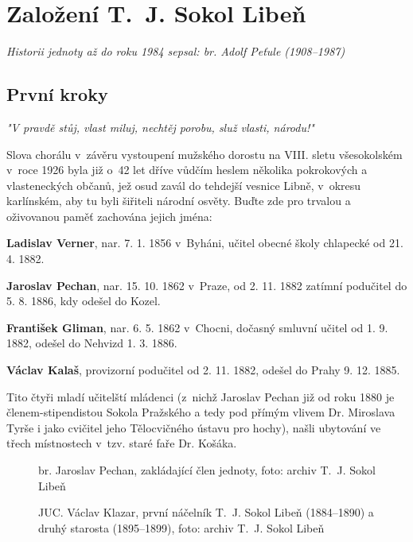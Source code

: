 \documentclass[a5paper, 12pt, twoside]{article}
\begin{document}
\clearpage

\section{Založení T.~J. Sokol Libeň}
\vspace{\baselineskip}

\textit{Historii jednoty až do roku 1984 sepsal: br. Adolf Peťule (1908–1987)}

\subsection{První kroky}

\begin{center}
  \textit{"V pravdě stůj, vlast miluj, nechtěj porobu, služ vlasti, národu!"}
\end{center}
\noindent Slova chorálu v~závěru vystoupení mužského dorostu na VIII. sletu všesokolském v~roce 1926 byla již o~42 let dříve vůdčím heslem několika pokrokových a vlasteneckých občanů, jež osud zavál do tehdejší vesnice Libně, v~okresu karlínském, aby tu byli šiřiteli národní osvěty. Buďte zde pro trvalou a oživovanou paměť zachována jejich jména:

\textbf{Ladislav Verner}, nar. 7. 1. 1856 v~Byháni, učitel obecné školy chlapecké od 21. 4. 1882.

\textbf{Jaroslav Pechan}, nar. 15. 10. 1862 v~Praze, od 2. 11. 1882 zatímní podučitel do 5. 8. 1886, kdy odešel do Kozel.

\textbf{František Gliman}, nar. 6. 5. 1862 v~Chocni, dočasný smluvní učitel od 1. 9. 1882, odešel do Nehvizd 1. 3. 1886.

\textbf{Václav Kalaš}, provizorní podučitel od 2. 11. 1882, odešel do Prahy 9. 12. 1885.

Tito čtyři mladí učitelští mládenci (z~nichž Jaroslav Pechan již od roku 1880 je členem-stipendistou Sokola Pražského a tedy pod přímým vlivem Dr. Miroslava Tyrše i jako cvičitel jeho Tělocvičného ústavu pro hochy), našli ubytování ve třech místnostech v~tzv. staré faře Dr. Košáka.

\begin{figure*}[h]
  \centering
  \begin{subfigure}{0.45\textwidth}
  \caption*{br. Jaroslav Pechan, zakládající člen jednoty, foto: archiv T.~J. Sokol Libeň}
  \end{subfigure}
  \hfill
  \begin{subfigure}{0.45\textwidth}
  \caption*{JUC. Václav Klazar, první náčelník T.~J. Sokol Libeň (1884–⁠⁠⁠⁠⁠⁠1890) a druhý starosta (1895–⁠⁠⁠⁠⁠⁠1899), foto: archiv T.~J. Sokol Libeň}
  \end{subfigure}
\end{figure*}
\end{document}
